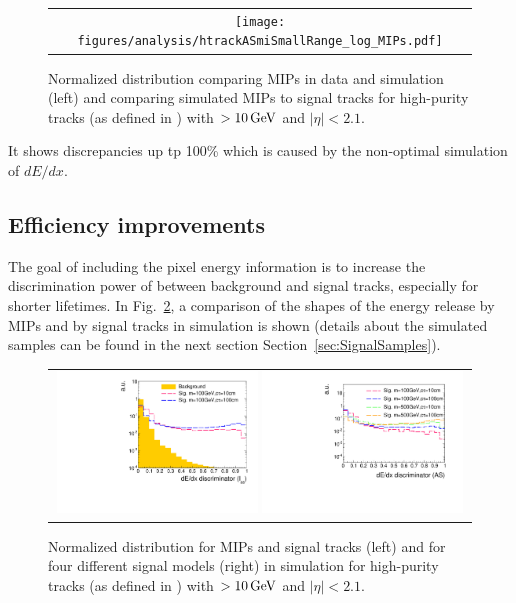 \begin{figure}[!bt]
  \centering 
  \begin{tabular}{c}
    \texttt{[image: figures/analysis/htrackASmiSmallRange\_log\_MIPs.pdf]}
  \end{tabular}
  \caption{Normalized \ias distribution comparing MIPs in data and simulation (left) and comparing simulated MIPs to signal tracks for high-purity tracks (as defined in \cite{bib:CMS:Tracking_2010}) with \pt$>10\,\text{Ge}\kern-0.06667em\text{V}$ and $|\eta|<2.1$.}
  \label{fig:Data-MC-Dedx_MIPs}
\end{figure}
It shows discrepancies up tp 100\% which is caused by the non-optimal simulation of $dE/dx$.\\


\subsection{Efficiency improvements}
The goal of including the pixel energy information is to increase the discrimination power of \ias between background and signal tracks, especially for shorter lifetimes.
In Fig.~\ref{fig:MIPs-Signal-Dedx}, a comparison of the shapes of the energy release by MIPs and by signal tracks in simulation is shown (details about the simulated samples can be found in the next section Section~\ref{sec:SignalSamples}).
\begin{figure}[!bt]
  \centering 
  \begin{tabular}{c}
    \includegraphics[width=0.49\textwidth]{figures/analysis/htrackASmiSmallRangePlusSM_log.pdf}   
    \includegraphics[width=0.49\textwidth]{figures/analysis/htrackASmiSmallRange_log.pdf}
  \end{tabular}
  \caption{Normalized \ias distribution for MIPs and signal tracks (left) and for four different signal models (right) in simulation 
           for high-purity tracks (as defined in \cite{bib:CMS:Tracking_2010}) with \pt$>10\,\text{Ge}\kern-0.06667em\text{V}$ and $|\eta|<2.1$.}
  \label{fig:MIPs-Signal-Dedx}
\end{figure} 
